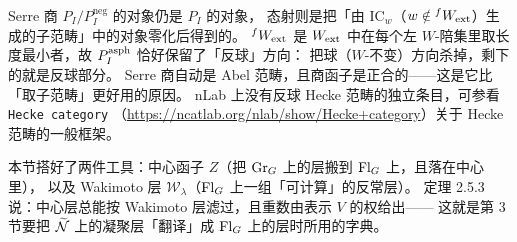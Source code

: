 \begin{yizhu}
Serre 商 $P_I/P_I^{\mathrm{neg}}$ 的对象仍是 $P_I$ 的对象，
态射则是把「由 $\mathrm{IC}_w$（$w\notin{}^{f}W_{\mathrm{ext}}$）生成的子范畴」中的对象零化后得到的。
${}^{f}W_{\mathrm{ext}}$ 是 $W_{\mathrm{ext}}$ 中在每个左 $W$-陪集里取长度最小者，故 $P_I^{\mathrm{asph}}$ 恰好保留了「反球」方向：
把球（$W$-不变）方向杀掉，剩下的就是反球部分。
Serre 商自动是 Abel 范畴，且商函子是正合的——这是它比「取子范畴」更好用的原因。
nLab 上没有反球 Hecke 范畴的独立条目，可参看 \texttt{Hecke category}
（\url{https://ncatlab.org/nlab/show/Hecke+category}）关于 Hecke 范畴的一般框架。
\end{yizhu}

\begin{keytakeaways}
本节搭好了两件工具：中心函子 $Z$（把 $\mathrm{Gr}_G$ 上的层搬到 $\mathrm{Fl}_G$ 上，且落在中心里），
以及 Wakimoto 层 $\mathcal{W}_\lambda$（$\mathrm{Fl}_G$ 上一组「可计算」的反常层）。
定理 2.5.3 说：中心层总能按 Wakimoto 层滤过，且重数由表示 $V$ 的权给出——
这就是第 3 节要把 $\widetilde{\mathcal{N}}$ 上的凝聚层「翻译」成 $\mathrm{Fl}_G$ 上的层时所用的字典。
\end{keytakeaways}
